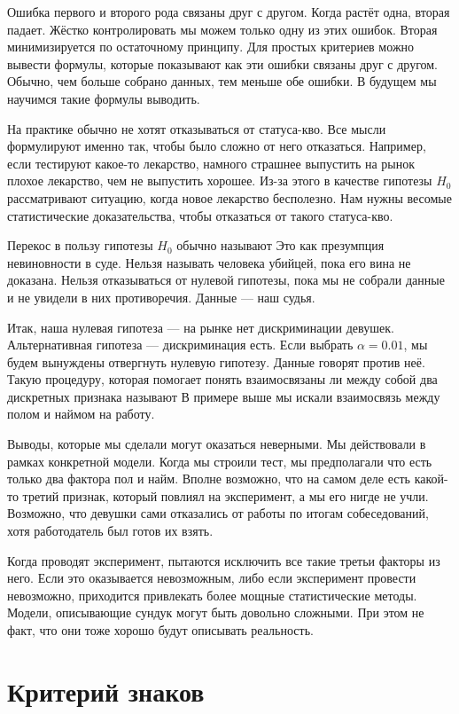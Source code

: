\documentclass[12pt, a4paper, oneside]{article}
\begin{document}
Ошибка первого и второго рода связаны друг с другом. Когда растёт одна, вторая падает. Жёстко контролировать мы можем только одну из этих ошибок. Вторая минимизируется по остаточному принципу. Для простых критериев можно вывести формулы, которые показывают как эти ошибки связаны друг с другом. Обычно, чем больше собрано данных, тем меньше обе ошибки. В будущем мы научимся такие формулы выводить. 

На практике обычно не хотят отказываться от статуса-кво. Все мысли формулируют именно так, чтобы было сложно от него отказаться. Например, если тестируют какое-то лекарство, намного страшнее выпустить на рынок плохое лекарство, чем не выпустить хорошее. Из-за этого в качестве гипотезы $H_0$ рассматривают ситуацию, когда новое лекарство бесполезно. Нам нужны весомые статистические доказательства, чтобы отказаться от такого статуса-кво. 

Перекос в пользу гипотезы $H_0$ обычно называют  Это как презумпция невиновности в суде.  Нельзя называть человека убийцей, пока его вина не доказана. Нельзя отказываться от нулевой гипотезы, пока мы не собрали данные и не увидели в них противоречия. Данные --- наш судья. 

Итак, наша нулевая гипотеза --- на рынке нет дискриминации девушек. Альтернативная гипотеза --- дискриминация есть. Если выбрать $\alpha = 0.01$, мы будем вынуждены отвергнуть нулевую гипотезу. Данные говорят против неё. Такую процедуру, которая помогает понять взаимосвязаны ли между собой два дискретных признака называют  В примере выше мы искали взаимосвязь между полом и наймом на работу. 

Выводы, которые мы сделали могут оказаться неверными. Мы действовали в рамках конкретной модели. Когда мы строили тест, мы предполагали что есть только два фактора пол и найм. Вполне возможно, что на самом деле есть какой-то третий признак, который повлиял на эксперимент, а мы его нигде не учли. Возможно, что девушки сами отказались от работы по итогам собеседований, хотя работодатель был готов их взять. 

Когда проводят эксперимент, пытаются исключить все такие третьи факторы из него. Если это оказывается невозможным, либо если эксперимент провести невозможно, приходится привлекать более мощные статистические методы. Модели, описывающие сундук могут быть довольно сложными. При этом не факт, что они тоже хорошо будут описывать реальность.

\section{Критерий знаков}
\end{document}
